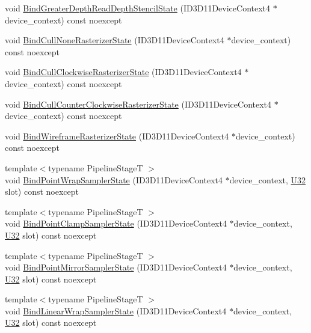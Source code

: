 \begin{DoxyCompactItemize}
\item 
void \hyperlink{classmage_1_1_rendering_state_manager_a52ea438f9dde2d461a038932dd104ef8}{Bind\+Greater\+Depth\+Read\+Depth\+Stencil\+State} (I\+D3\+D11\+Device\+Context4 $\ast$device\+\_\+context) const noexcept
\item 
void \hyperlink{classmage_1_1_rendering_state_manager_a9dfef6d7fb2cea65fc362e4768088ed0}{Bind\+Cull\+None\+Rasterizer\+State} (I\+D3\+D11\+Device\+Context4 $\ast$device\+\_\+context) const noexcept
\item 
void \hyperlink{classmage_1_1_rendering_state_manager_a02d762d33aa2aff3ebdbe69ec6f35787}{Bind\+Cull\+Clockwise\+Rasterizer\+State} (I\+D3\+D11\+Device\+Context4 $\ast$device\+\_\+context) const noexcept
\item 
void \hyperlink{classmage_1_1_rendering_state_manager_a54d2bc53eaeb2ac0a01a2b9e26890f77}{Bind\+Cull\+Counter\+Clockwise\+Rasterizer\+State} (I\+D3\+D11\+Device\+Context4 $\ast$device\+\_\+context) const noexcept
\item 
void \hyperlink{classmage_1_1_rendering_state_manager_a1e199563076b4596bfaa0bac22a86848}{Bind\+Wireframe\+Rasterizer\+State} (I\+D3\+D11\+Device\+Context4 $\ast$device\+\_\+context) const noexcept
\item 
{\footnotesize template$<$typename Pipeline\+StageT $>$ }\\void \hyperlink{classmage_1_1_rendering_state_manager_aa0ad7b628aa8d93b5de8bd398ac8e52a}{Bind\+Point\+Wrap\+Sampler\+State} (I\+D3\+D11\+Device\+Context4 $\ast$device\+\_\+context, \hyperlink{namespacemage_a41c104c036fba3756a74e19f793eeaa1}{U32} slot) const noexcept
\item 
{\footnotesize template$<$typename Pipeline\+StageT $>$ }\\void \hyperlink{classmage_1_1_rendering_state_manager_a704a0131b99623a7a2b9d032891c0e25}{Bind\+Point\+Clamp\+Sampler\+State} (I\+D3\+D11\+Device\+Context4 $\ast$device\+\_\+context, \hyperlink{namespacemage_a41c104c036fba3756a74e19f793eeaa1}{U32} slot) const noexcept
\item 
{\footnotesize template$<$typename Pipeline\+StageT $>$ }\\void \hyperlink{classmage_1_1_rendering_state_manager_a98258c392a171347ed75efcf6ab7da58}{Bind\+Point\+Mirror\+Sampler\+State} (I\+D3\+D11\+Device\+Context4 $\ast$device\+\_\+context, \hyperlink{namespacemage_a41c104c036fba3756a74e19f793eeaa1}{U32} slot) const noexcept
\item 
{\footnotesize template$<$typename Pipeline\+StageT $>$ }\\void \hyperlink{classmage_1_1_rendering_state_manager_a75657c95338941b359683ba9dee58aa3}{Bind\+Linear\+Wrap\+Sampler\+State} (I\+D3\+D11\+Device\+Context4 $\ast$device\+\_\+context, \hyperlink{namespacemage_a41c104c036fba3756a74e19f793eeaa1}{U32} slot) const noexcept

\end{DoxyCompactItemize}
